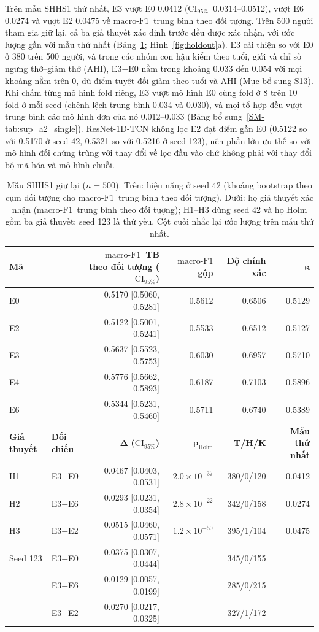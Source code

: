 \documentclass[11pt,a4paper]{article}
\newcommand{\mf}{\ensuremath{\mathrm{macro\text{-}F1}}}
\newcommand{\ci}{\ensuremath{\mathrm{CI}_{95\%}}}
\begin{document}
Trên mẫu SHHS1 thứ nhất, E3 vượt E0 0.0412 (\ci\ 0.0314--0.0512), vượt E6 0.0274 và vượt E2 0.0475 về \mf\
trung bình theo đối tượng. Trên 500 người tham gia giữ lại, cả ba giả thuyết xác định trước đều được xác nhận,
với ước lượng gần với mẫu thứ nhất (Bảng~\ref{tab:holdout}; Hình~\ref{fig:holdout}a). E3 cải thiện so với E0 ở
380 trên 500 người, và trong các nhóm con hậu kiểm theo tuổi, giới và chỉ số ngưng thở--giảm thở (AHI),
E3$-$E0 nằm trong khoảng 0.033 đến 0.054 với mọi khoảng nằm trên 0, dù điểm tuyệt đối giảm theo tuổi và AHI
(Mục bổ sung S13). Khi chấm từng mô hình fold riêng, E3 vượt mô hình E0 cùng fold ở 8 trên 10 fold ở mỗi seed
(chênh lệch trung bình 0.034 và 0.030), và mọi tổ hợp đều vượt trung bình các mô hình đơn của nó 0.012--0.033
(Bảng bổ sung~\ref{SM-tab:sup_a2_single}). ResNet-1D-TCN không lọc E2 đạt điểm gần E0 (0.5122 so với 0.5170 ở seed 42, 0.5321 so với
0.5216 ở seed 123), nên phần lớn ưu thế so với mô hình đối chứng trùng với thay đổi về lọc đầu vào chứ không phải
với thay đổi bộ mã hóa và mô hình chuỗi.

\begin{table}[H]
\centering
\caption{Mẫu SHHS1 giữ lại ($n=500$). Trên: hiệu năng ở seed 42 (khoảng bootstrap theo cụm đối tượng cho \mf\
trung bình theo đối tượng). Dưới: họ giả thuyết xác nhận (\mf\ trung bình theo đối tượng); H1--H3 dùng seed 42
và họ Holm gồm ba giả thuyết; seed 123 là thứ yếu. Cột cuối nhắc lại ước lượng trên mẫu thứ nhất.}
\label{tab:holdout}
\small
\begin{tabular}{llrrrr}
\toprule
\textbf{Mã} & & \textbf{\mf\ TB theo đối tượng (\ci)} & \textbf{\mf\ gộp} & \textbf{Độ chính xác} & $\boldsymbol{\kappa}$ \\
\midrule
E0 & & 0.5170 [0.5060, 0.5281] & 0.5612 & 0.6506 & 0.5129 \\
E2 & & 0.5122 [0.5001, 0.5241] & 0.5533 & 0.6512 & 0.5127 \\
E3 & & 0.5637 [0.5523, 0.5753] & 0.6030 & 0.6957 & 0.5710 \\
E4 & & 0.5776 [0.5662, 0.5893] & 0.6187 & 0.7103 & 0.5896 \\
E6 & & 0.5344 [0.5231, 0.5460] & 0.5711 & 0.6740 & 0.5389 \\
\midrule
\textbf{Giả thuyết} & \textbf{Đối chiếu} & $\boldsymbol{\Delta}$ \textbf{(\ci)} & $\boldsymbol{p_{\mathrm{Holm}}}$ & \textbf{T/H/K} & \textbf{Mẫu thứ nhất} \\
\midrule
H1 & E3$-$E0 & 0.0467 [0.0403, 0.0531] & $2.0\times10^{-37}$ & 380/0/120 & 0.0412 \\
H2 & E3$-$E6 & 0.0293 [0.0231, 0.0354] & $2.8\times10^{-22}$ & 342/0/158 & 0.0274 \\
H3 & E3$-$E2 & 0.0515 [0.0460, 0.0571] & $1.2\times10^{-50}$ & 395/1/104 & 0.0475 \\
Seed 123 & E3$-$E0 & 0.0375 [0.0307, 0.0444] & & 345/0/155 & \\
 & E3$-$E6 & 0.0129 [0.0057, 0.0199] & & 285/0/215 & \\
 & E3$-$E2 & 0.0270 [0.0217, 0.0325] & & 327/1/172 & \\
\bottomrule
\end{tabular}
\end{table}
\end{document}
